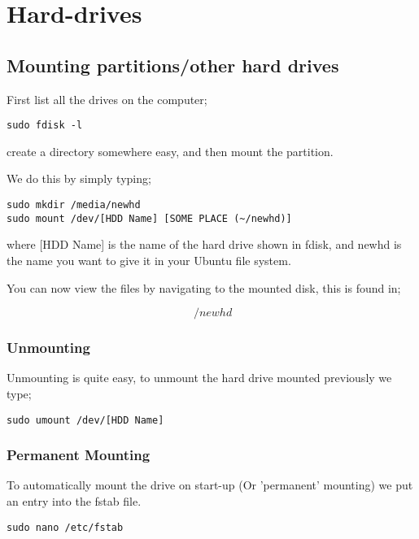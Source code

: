 \chapter{Hard-drives}
\label{chp:hardware}

\section{Mounting partitions/other hard drives}
\label{sec:mount_hd}

First list all the drives on the computer;

\begin{lstlisting}
sudo fdisk -l
\end{lstlisting}

create a directory somewhere easy, and then mount the partition.

We do this by simply typing;

\begin{lstlisting}
sudo mkdir /media/newhd
sudo mount /dev/[HDD Name] [SOME PLACE (~/newhd)]
\end{lstlisting}

where [HDD Name] is the name of the hard drive shown in fdisk, and newhd is the name you want to give it in your Ubuntu file system.

You can now view the files by navigating to the mounted disk, this is found in;

$$~/newhd$$

\subsection{Unmounting}

Unmounting is quite easy, to unmount the hard drive mounted previously we type;

\begin{lstlisting}
sudo umount /dev/[HDD Name]
\end{lstlisting}

\subsection{Permanent Mounting}
\label{ssec:permanentHDMount}

To automatically mount the drive on start-up (Or 'permanent' mounting) we put an entry into the fstab file.

\begin{lstlisting}
sudo nano /etc/fstab
\end{lstlisting}

